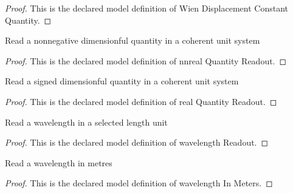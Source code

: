 \begin{proof}
  This is the declared model definition of Wien Displacement Constant Quantity.
\end{proof}
\begin{definition}
  \label{def:physics:phyx-mini-0646:phyxminiproblems-problemphyxmini0646-nnrealquantityreadout}
  Read a nonnegative dimensionful quantity in a coherent unit system
\end{definition}
\begin{proof}
  This is the declared model definition of nnreal Quantity Readout.
\end{proof}
\begin{definition}
  \label{def:physics:phyx-mini-0646:phyxminiproblems-problemphyxmini0646-realquantityreadout}
  Read a signed dimensionful quantity in a coherent unit system
\end{definition}
\begin{proof}
  This is the declared model definition of real Quantity Readout.
\end{proof}
\begin{definition}
  \label{def:physics:phyx-mini-0646:phyxminiproblems-problemphyxmini0646-wavelengthreadout}
  Read a wavelength in a selected length unit
\end{definition}
\begin{proof}
  This is the declared model definition of wavelength Readout.
\end{proof}
\begin{definition}
  \label{def:physics:phyx-mini-0646:phyxminiproblems-problemphyxmini0646-wavelengthinmeters}
  Read a wavelength in metres
\end{definition}
\begin{proof}
  This is the declared model definition of wavelength In Meters.
\end{proof}
